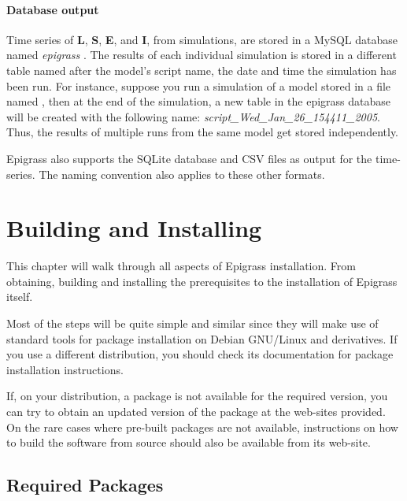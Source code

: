 \documentclass[a4paper,10pt]{manual}
\begin{document}
\subsubsection{Database output}
Time series of \textbf{L}, \textbf{S}, \textbf{E}, and \textbf{I}, from simulations, are stored in a MySQL database named \emph{epigrass} . The results of each individual simulation is stored in a different table named after the model's script name, the date and time the simulation has been run. For instance, suppose you run a simulation of a model stored in a file named , then at the end of the simulation, a new table in the epigrass database will be created with the following name: \emph{script\_Wed\_Jan\_26\_154411\_2005}. Thus, the results of multiple runs from the same model get stored independently.

Epigrass also supports the SQLite database and CSV files as output for the time-series. The naming convention also applies to these other formats.
\resetcurrentobjects


\hypertarget{install}{}\chapter{Building and Installing}

This chapter will walk through all aspects of Epigrass installation. From obtaining, building and installing  the prerequisites to the installation of Epigrass itself.

Most of the steps will be quite simple and similar since they will make use of standard tools for package installation on Debian GNU/Linux and derivatives. If you use a different distribution, you should check its documentation for package installation instructions.

If, on your distribution, a package is not available for the required version, you can try to obtain an updated version of the package at the web-sites provided. On the rare cases where pre-built packages are not available, instructions on how to build the software from source should also be available from its web-site.


\section{Required Packages}
\end{document}
